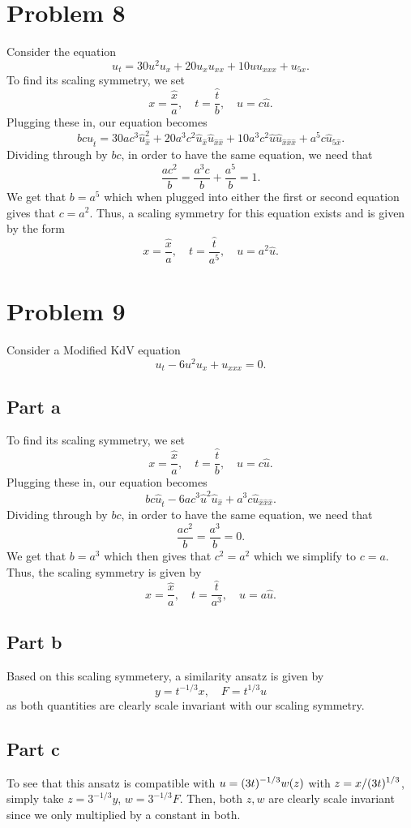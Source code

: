 \documentclass{article}
\begin{document}
\section{Problem 8}
 Consider the equation
\[
u_t=30u^2 u_x+20u_x u_{xx}+10 u u_{xxx}+u_{5x}.
\]
To find its scaling symmetry, we set 
\[
x=\frac{\hat{x}}{a},\quad t=\frac{\hat{t}}{b}, \quad u=c\hat{u}.
\]
Plugging these in, our equation becomes
\[
bc\hat{u}_{\hat{t}}=30ac^3\hat{u}^2_{\hat{x}}+20a^3c^2\hat{u}_{\hat{x}}\hat{u}_{\hat{x}\hat{x}}+10a^3c^2\hat{u}\hat{u}_{\hat{x}\hat{x}\hat{x}}+a^5c\hat{u}_{5\hat{x}}.
\]
Dividing through by $bc$, in order to have the same equation, we need that
\[
\frac{ac^2}{b}=\frac{a^3c}{b}+\frac{a^5}{b}=1.
\]
We get that $b=a^5$ which when plugged into either the first or second equation gives that $c=a^2$. Thus, a scaling symmetry for this equation exists and is given by the form
\[
x=\frac{\hat{x}}{a},\quad t=\frac{\hat{t}}{a^5}, \quad u=a^2\hat{u}.
\]

\section{Problem 9}
Consider a Modified KdV equation
\[
u_t-6 u^2 u_x+u_{xxx}=0.
\]
\subsection{Part a}
To find its scaling symmetry, we set 
\[
x=\frac{\hat{x}}{a},\quad t=\frac{\hat{t}}{b}, \quad u=c\hat{u}.
\]
Plugging these in, our equation becomes
\[
bc\hat{u}_{\hat{t}}-6ac^3\hat{u}^2\hat{u}_{\hat{x}}+a^3c\hat{u}_{\hat{x}\hat{x}\hat{x}}.
\]
Dividing through by $bc$, in order to have the same equation, we need that
\[
\frac{ac^2}{b}=\frac{a^3}{b}=0.
\]
We get that $b=a^3$ which then gives that $c^2=a^2$ which we simplify to $c=a$. Thus, the scaling symmetry is given by
\[
x=\frac{\hat{x}}{a},\quad t=\frac{\hat{t}}{a^3}, \quad u=a\hat{u}.
\]
\subsection{Part b}
Based on this scaling symmetery, a similarity ansatz is given by
\[
y=t^{-1/3}x,\quad F=t^{1/3}u
\]
as both quantities are clearly scale invariant with our scaling symmetry. 
\subsection{Part c}
To see that this ansatz is compatible with
$\displaystyle u=(3t)^{-1/3}w(z)$ with $\displaystyle z=x/(3t)^{1/3}$, simply take $z=3^{-1/3}y$, $w=3^{-1/3}F$. Then, both $z,w$ are clearly scale invariant since we only multiplied by a constant in both. %
\end{document}
